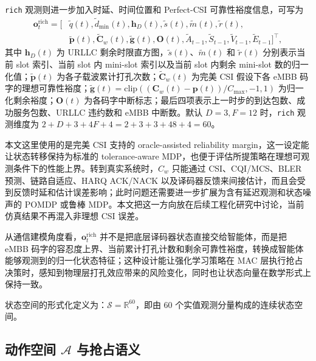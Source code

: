 \texttt{rich} 观测则进一步加入时延、时间位置和 Perfect-CSI 可靠性裕度信息，可写为
\begin{equation}
\begin{aligned}
\mathbf{o}^{\mathrm{rich}}_t =
\bigl[
&\tilde{q}(t),\tilde{d}_{\min}(t),
\mathbf{h}_D(t),
\tilde{s}(t),\tilde{m}(t),\tilde{r}(t),\\
&\tilde{\mathbf{p}}(t),
\tilde{\mathbf{C}}_w(t),
\tilde{\mathbf{g}}(t),
\mathbf{O}(t),
\tilde{A}_{t-1},\tilde{S}_{t-1},\tilde{V}_{t-1},\tilde{E}_{t-1}
\bigr]^\top ,
\end{aligned}
\label{eq:rich_observation}
\end{equation}
其中 \(\mathbf{h}_D(t)\) 为 URLLC 剩余时限直方图，\(\tilde{s}(t)\)、\(\tilde{m}(t)\) 和 \(\tilde{r}(t)\) 分别表示当前 slot 索引、当前 slot 内 mini-slot 索引以及当前 slot 内剩余 mini-slot 数的归一化值；\(\tilde{\mathbf{p}}(t)\) 为各子载波累计打孔次数；\(\tilde{\mathbf{C}}_w(t)\) 为完美 CSI 假设下各 eMBB 码字的理想可靠性裕度；\(\tilde{\mathbf{g}}(t)=\mathrm{clip}((\mathbf{C}_w(t)-\mathbf{p}(t))/C_{\max},-1,1)\) 为归一化剩余裕度；\(\mathbf{O}(t)\) 为各码字中断标志；最后四项表示上一时步的到达包数、成功服务包数、URLLC 违约数和 eMBB 中断数。默认 \(D=3,F=12\) 时，\texttt{rich} 观测维度为
\(2+D+3+4F+4 = 2+3+3+48+4 = 60\)。

本文这里使用的是完美 CSI 支持的 oracle-assisted reliability margin，这一设定能让状态转移保持为标准的 tolerance-aware MDP，也便于评估所提策略在理想可观测条件下的性能上界。转到真实系统时，\(C_w\) 只能通过 CSI、CQI/MCS、BLER 预测、链路自适应、HARQ ACK/NACK 以及译码器反馈来间接估计，而且会受到反馈时延和估计误差影响；此时问题还需要进一步扩展为含有延迟观测和状态噪声的 POMDP 或鲁棒 MDP。本文把这一方向放在后续工程化研究中讨论，当前仿真结果不再混入非理想 CSI 误差。

从通信建模角度看，\(\mathbf{o}^{\mathrm{rich}}_t\) 并不是把底层译码器状态直接交给智能体，而是把 eMBB 码字的容忍度上界、当前累计打孔计数和剩余可靠性裕度，转换成智能体能够观测到的归一化状态特征；这种设计能让强化学习策略在 MAC 层执行抢占决策时，感知到物理层打孔效应带来的风险变化，同时也让状态向量在数学形式上保持一致。

状态空间的形式化定义为：\(\mathcal{S} = \mathbb{R}^{60}\)，即由 60 个实值观测分量构成的连续状态空间。







\subsection{动作空间 \texorpdfstring{$\mathcal{A}$}{A} 与抢占语义}\label{332-ux52a8ux4f5cux7a7aux95f4-mathcala-ux4e0eux6253ux5b54ux8bedux4e49}

